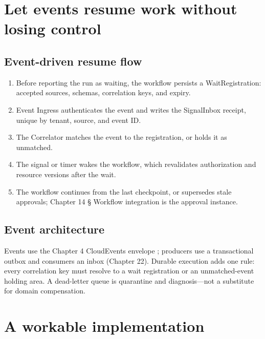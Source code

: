 \section{Let events resume work without losing control}

\subsection{Event-driven resume flow}

\begin{enumerate}

\item Before reporting the run as waiting, the workflow persists a WaitRegistration: accepted sources, schemas, correlation keys, and expiry.

\item Event Ingress authenticates the event and writes the SignalInbox receipt, unique by tenant, source, and event ID.

\item The Correlator matches the event to the registration, or holds it as unmatched.

\item The signal or timer wakes the workflow, which revalidates authorization and resource versions after the wait.

\item The workflow continues from the last checkpoint, or supersedes stale approvals; Chapter 14 § Workflow integration is the approval instance.

\end{enumerate}

\subsection{Event architecture}

Events use the Chapter 4 CloudEvents envelope ; producers use a transactional outbox and consumers an inbox (Chapter 22). Durable execution adds one rule: every correlation key must resolve to a wait registration or an unmatched-event holding area. A dead-letter queue is quarantine and diagnosis—not a substitute for domain compensation.\par

\section{A workable implementation}


